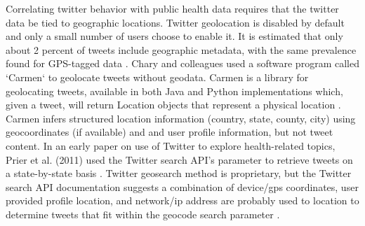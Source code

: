\documentclass[sigconf]{acmart}
\begin{document}
Correlating twitter behavior with public health data requires that the twitter 
data be tied to geographic locations. Twitter geolocation is disabled by 
default and only a small number of users choose to enable it. It is estimated 
that only about 2 percent of tweets include geographic metadata, with the 
same prevalence found for GPS-tagged data \cite{chary17, leetaru13}. 
Chary and colleagues used a software program called `Carmen` to geolocate 
tweets without geodata. Carmen is a library for geolocating tweets, available 
in both Java and Python implementations which, given a tweet, will return 
Location objects that represent a physical location \cite{dredze13}. Carmen 
infers structured location information (country, state, county, city) using 
geocoordinates (if available) and and user profile information, but not tweet 
content. In an early paper on use of Twitter to explore health-related topics, 
Prier et al. (2011) used the Twitter search API’s parameter to retrieve tweets 
on a state-by-state basis \cite{prier11}. Twitter geosearch method is 
proprietary, but the Twitter search API documentation suggests a combination 
of device/gps coordinates, user provided profile location, and network/ip 
address are probably used to location to determine tweets that fit within 
the geocode search parameter \cite{twitterGet}.

\end{document}
